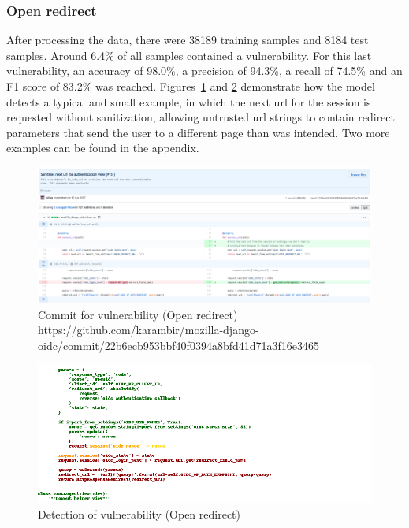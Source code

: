 \documentclass[
a4paper,
pagesize,
pdftex,
12pt,
twoside, %
BCOR=5mm, %
ngerman,
fleqn,
final,
]{scrartcl}
\begin{document}
	
	\subsubsection{Open redirect}
	After processing the data, there were 38189 training samples and 8184 test samples. Around 6.4\% of all samples contained a vulnerability. For this last vulnerability, an accuracy of 98.0\%, a precision of 94.3\%, a recall of 74.5\% and an F1 score of 83.2\% was reached. Figures~\ref{fig:open_redirectA} and \ref{fig:open_redirectAr} demonstrate how the model detects a typical and small example, in which the next url for the session is requested without sanitization, allowing untrusted url strings to contain redirect parameters that send the user to a different page than was intended. Two more examples can be found in the appendix.
		
	\begin{figure}[H]
		\centering
		\includegraphics[width=\linewidth]{Images/open_redirectA}
		\caption{Commit for vulnerability (Open redirect) \newline \scriptsize{
				https://github.com/karambir/mozilla-django-oidc/commit/22b6ecb953bbf40f0394a8bfd41d71a3f16e3465}}
		\label{fig:open_redirectA}
	\end{figure}
	\begin{figure}[H]
		\centering
		\includegraphics[width=\linewidth]{Images/open_redirectAr}
		\caption{Detection of vulnerability (Open redirect)}
		\label{fig:open_redirectAr}
	\end{figure}
	\newpage
\end{document}

